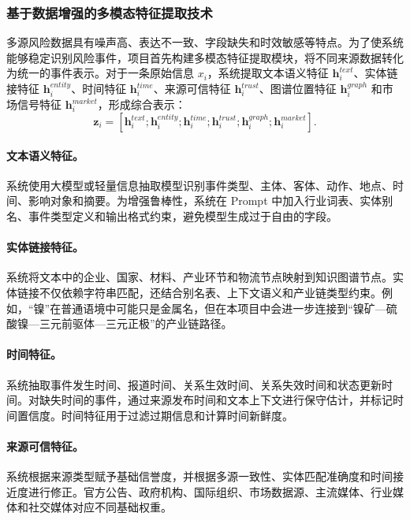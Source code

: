 \documentclass[12pt,a4paper]{article}
\begin{document}
\subsubsection{基于数据增强的多模态特征提取技术}

多源风险数据具有噪声高、表达不一致、字段缺失和时效敏感等特点。为了使系统能够稳定识别风险事件，项目首先构建多模态特征提取模块，将不同来源数据转化为统一的事件表示。对于一条原始信息 $x_i$，系统提取文本语义特征 $\bm{h}^{text}_i$、实体链接特征 $\bm{h}^{entity}_i$、时间特征 $\bm{h}^{time}_i$、来源可信特征 $\bm{h}^{trust}_i$、图谱位置特征 $\bm{h}^{graph}_i$ 和市场信号特征 $\bm{h}^{market}_i$，形成综合表示：
\begin{equation}
\bm{z}_i = \left[\bm{h}^{text}_i;\bm{h}^{entity}_i;\bm{h}^{time}_i;\bm{h}^{trust}_i;\bm{h}^{graph}_i;\bm{h}^{market}_i\right].
\end{equation}

\paragraph{文本语义特征。}系统使用大模型或轻量信息抽取模型识别事件类型、主体、客体、动作、地点、时间、影响对象和摘要。为增强鲁棒性，系统在 Prompt 中加入行业词表、实体别名、事件类型定义和输出格式约束，避免模型生成过于自由的字段。

\paragraph{实体链接特征。}系统将文本中的企业、国家、材料、产业环节和物流节点映射到知识图谱节点。实体链接不仅依赖字符串匹配，还结合别名表、上下文语义和产业链类型约束。例如，“镍”在普通语境中可能只是金属名，但在本项目中会进一步连接到“镍矿—硫酸镍—三元前驱体—三元正极”的产业链路径。

\paragraph{时间特征。}系统抽取事件发生时间、报道时间、关系生效时间、关系失效时间和状态更新时间。对缺失时间的事件，通过来源发布时间和文本上下文进行保守估计，并标记时间置信度。时间特征用于过滤过期信息和计算时间新鲜度。

\paragraph{来源可信特征。}系统根据来源类型赋予基础信誉度，并根据多源一致性、实体匹配准确度和时间接近度进行修正。官方公告、政府机构、国际组织、市场数据源、主流媒体、行业媒体和社交媒体对应不同基础权重。
\end{document}
